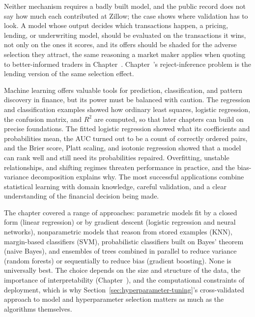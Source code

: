 \documentclass[../ai_in_finance]{subfiles}
\begin{document}
Neither mechanism requires a badly built model, and the public record does not say how much each contributed at Zillow; the case shows where validation has to look. A model whose output decides which transactions happen, a pricing, lending, or underwriting model, should be evaluated on the transactions it wins, not only on the ones it scores, and its offers should be shaded for the adverse selection they attract, the same reasoning a market maker applies when quoting to better-informed traders in Chapter~. Chapter~'s reject-inference problem is the lending version of the same selection effect.


Machine learning offers valuable tools for prediction, classification, and pattern discovery in finance, but its power must be balanced with caution. The regression and classification examples showed how ordinary least squares, logistic regression, the confusion matrix, and $R^2$ are computed, so that later chapters can build on precise foundations. The fitted logistic regression showed what its coefficients and probabilities mean, the AUC turned out to be a count of correctly ordered pairs, and the Brier score, Platt scaling, and isotonic regression showed that a model can rank well and still need its probabilities repaired. Overfitting, unstable relationships, and shifting regimes threaten performance in practice, and the bias-variance decomposition explains why. The most successful applications combine statistical learning with domain knowledge, careful validation, and a clear understanding of the financial decision being made.

The chapter covered a range of approaches: parametric models fit by a closed form (linear regression) or by gradient descent (logistic regression and neural networks), nonparametric models that reason from stored examples (KNN), margin-based classifiers (SVM), probabilistic classifiers built on Bayes' theorem (naive Bayes), and ensembles of trees combined in parallel to reduce variance (random forests) or sequentially to reduce bias (gradient boosting). None is universally best. The choice depends on the size and structure of the data, the importance of interpretability (Chapter~), and the computational constraints of deployment, which is why Section~\ref{sec:hyperparameter-tuning}'s cross-validated approach to model and hyperparameter selection matters as much as the algorithms themselves.
\end{document}
